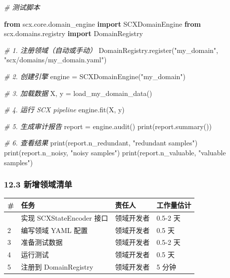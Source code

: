 \documentclass[
  12pt,
]{ctexart}
\newenvironment{Shaded}{}{}
\newcommand{\BuiltInTok}[1]{\textcolor[rgb]{0.00,0.50,0.00}{#1}}
\newcommand{\CommentTok}[1]{\textcolor[rgb]{0.38,0.63,0.69}{\textit{#1}}}
\newcommand{\ImportTok}[1]{\textcolor[rgb]{0.00,0.50,0.00}{\textbf{#1}}}
\newcommand{\NormalTok}[1]{#1}
\newcommand{\OperatorTok}[1]{\textcolor[rgb]{0.40,0.40,0.40}{#1}}
\newcommand{\StringTok}[1]{\textcolor[rgb]{0.25,0.44,0.63}{#1}}
\begin{document}
\begin{Shaded}
\begin{Highlighting}[]
\CommentTok{\# 测试脚本}

\ImportTok{from}\NormalTok{ scx.core.domain\_engine }\ImportTok{import}\NormalTok{ SCXDomainEngine}
\ImportTok{from}\NormalTok{ scx.domains.registry }\ImportTok{import}\NormalTok{ DomainRegistry}

\CommentTok{\# 1. 注册领域（自动或手动）}
\NormalTok{DomainRegistry.register(}\StringTok{"my\_domain"}\NormalTok{, }\StringTok{"scx/domains/my\_domain.yaml"}\NormalTok{)}

\CommentTok{\# 2. 创建引擎}
\NormalTok{engine }\OperatorTok{=}\NormalTok{ SCXDomainEngine(}\StringTok{"my\_domain"}\NormalTok{)}

\CommentTok{\# 3. 加载数据}
\NormalTok{X, y }\OperatorTok{=}\NormalTok{ load\_my\_domain\_data()}

\CommentTok{\# 4. 运行 SCX pipeline}
\NormalTok{engine.fit(X, y)}

\CommentTok{\# 5. 生成审计报告}
\NormalTok{report }\OperatorTok{=}\NormalTok{ engine.audit()}
\BuiltInTok{print}\NormalTok{(report.summary())}

\CommentTok{\# 6. 查看结果}
\BuiltInTok{print}\NormalTok{(report.n\_redundant, }\StringTok{"redundant samples"}\NormalTok{)}
\BuiltInTok{print}\NormalTok{(report.n\_noisy, }\StringTok{"noisy samples"}\NormalTok{)}
\BuiltInTok{print}\NormalTok{(report.n\_valuable, }\StringTok{"valuable samples"}\NormalTok{)}
\end{Highlighting}
\end{Shaded}

\subsubsection{12.3
新增领域清单}\label{ux65b0ux589eux9886ux57dfux6e05ux5355}

\begin{longtable}[]{@{}llll@{}}
\toprule\noalign{}
\# & 任务 & 责任人 & 工作量估计 \\
\midrule\noalign{}
\endhead
\bottomrule\noalign{}
\endlastfoot
1 & 实现 SCXStateEncoder 接口 & 领域开发者 & 0.5-2 天 \\
2 & 编写领域 YAML 配置 & 领域开发者 & 0.5 天 \\
3 & 准备测试数据 & 领域开发者 & 0.5-2 天 \\
4 & 运行测试 & 领域开发者 & 0.5 天 \\
5 & 注册到 DomainRegistry & 领域开发者 & 5 分钟 \\
\end{longtable}
\end{document}
